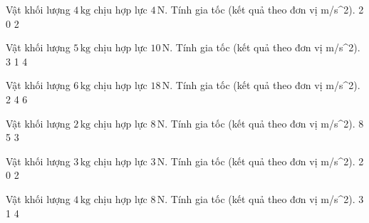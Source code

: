 \begin{ex}
Vật khối lượng $4\,\text{kg}$ chịu hợp lực $4\,\text{N}$. Tính gia tốc (kết quả theo đơn vị m/s^2).
\choice
{}
{2}
{0}
{2}
\end{ex}

\begin{ex}
Vật khối lượng $5\,\text{kg}$ chịu hợp lực $10\,\text{N}$. Tính gia tốc (kết quả theo đơn vị m/s^2).
\choice
{3}
{}
{1}
{4}
\end{ex}

\begin{ex}
Vật khối lượng $6\,\text{kg}$ chịu hợp lực $18\,\text{N}$. Tính gia tốc (kết quả theo đơn vị m/s^2).
\choice
{2}
{4}
{}
{6}
\end{ex}

\begin{ex}
Vật khối lượng $2\,\text{kg}$ chịu hợp lực $8\,\text{N}$. Tính gia tốc (kết quả theo đơn vị m/s^2).
\choice
{8}
{5}
{3}
{}
\end{ex}

\begin{ex}
Vật khối lượng $3\,\text{kg}$ chịu hợp lực $3\,\text{N}$. Tính gia tốc (kết quả theo đơn vị m/s^2).
\choice
{}
{2}
{0}
{2}
\end{ex}

\begin{ex}
Vật khối lượng $4\,\text{kg}$ chịu hợp lực $8\,\text{N}$. Tính gia tốc (kết quả theo đơn vị m/s^2).
\choice
{3}
{}
{1}
{4}
\end{ex}


